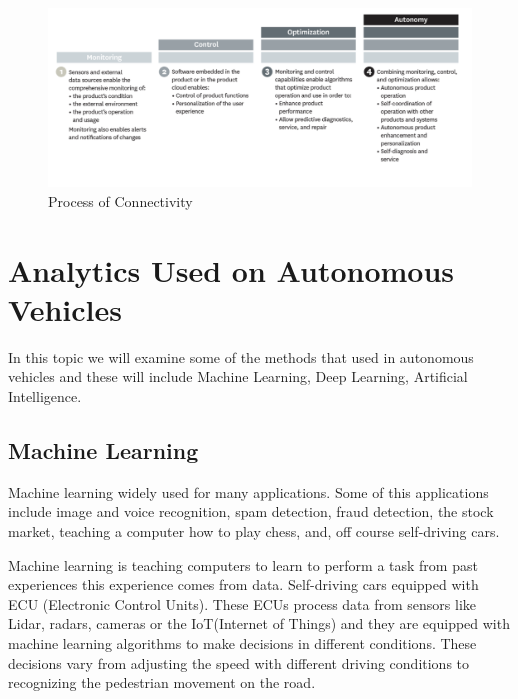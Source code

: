 \documentclass{acm_proc_article-sp}
\begin{document}
\begin{figure}[!ht]
  \centering
      \includegraphics[width=1.0\columnwidth]{images/picture2.png}
  \caption{Process of Connectivity}\label{fig:hbsconnectivitysteps}
\end{figure}


\section{Analytics Used on Autonomous Vehicles}
In this topic we will examine some of the methods that used in autonomous vehicles and these will include Machine Learning, Deep Learning, Artificial Intelligence.


\subsection{Machine Learning}

Machine learning widely used for many applications. Some of this applications include image and voice recognition, spam detection, fraud detection, the stock market, teaching a computer how to play chess, and, off course self-driving cars. 
\par Machine learning is teaching computers to learn to perform a task from past experiences this experience comes from data. Self-driving cars equipped with ECU (Electronic Control Units). These ECUs process data from sensors like Lidar, radars, cameras or the IoT(Internet of Things) and they are equipped with machine learning algorithms to make decisions in different conditions.\cite{www-kdnuggets} These decisions vary from adjusting the speed with different driving conditions to recognizing the pedestrian movement on the road. 
\end{document}
